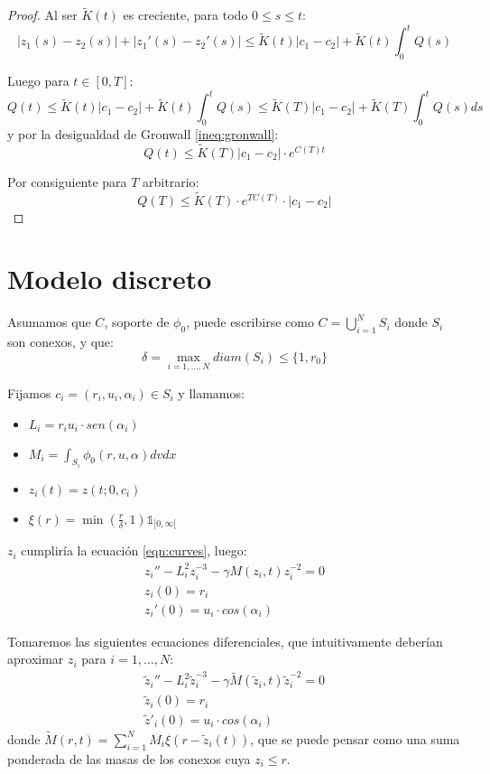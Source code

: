 \documentclass[a4paper,10pt]{scrartcl}
\theoremstyle{definition}
\numberwithin{equation}{section}
\begin{document}
\begin{proof}
 Al ser $\widetilde{K}(t)$ es creciente, para todo $0 \le s \le t$:
 \[
    |z_1(s) - z_2(s)| + |z_1'(s) - z_2'(s)|  \le \widetilde{K}(t)|c_1 - c_2| + \widetilde{K}(t) \int_0^t Q(s)
 \]

 Luego para $t\in [0,T]$:
 \[
  Q(t) \le \widetilde{K}(t)|c_1 - c_2| + \widetilde{K}(t) \int_0^t Q(s) \le \widetilde{K}(T)|c_1 - c_2| + \widetilde{K}(T) \int_0^t Q(s)ds
 \]
 y por la desigualdad de Gronwall \ref{ineq:gronwall}:
 \[
  Q(t) \le \widetilde{K}(T)|c_1 - c_2| \cdot e^{C(T)t}
 \]
 
 Por consiguiente para $T$ arbitrario:
 \[
  Q(T) \le \widetilde{K}(T)\cdot e^{TC(T)} \cdot |c_1 - c_2|
 \]
 
\end{proof}

\newpage
\section{Modelo discreto}
Asumamos que $C$, soporte de $\phi_0$, puede escribirse como $C= \bigcup_{i=1}^N S_i$ donde $S_i$ son conexos, y que:
\[
    \delta = \max_{i=1,\ldots, N} diam(S_i) \le \{1,r_0\}
\]

Fijamos $c_i = (r_i, u_i, \alpha_i) \in S_i$ y llamamos:
\begin{itemize}
\item $L_i = r_i u_i \cdot sen(\alpha_i)$
\item $M_i = \int_{S_i} \phi_0(r,u,\alpha) dv dx$
\item $z_i(t) = z(t;0,c_i)$
\item $\xi(r) = \min\left(\frac{r}{\delta},1\right) \mathds{1}_{]0,\infty[}$
\end{itemize}

$z_i$ cumpliría la ecuación \eqref{eqn:curves}, luego:
\begin{align*}
 z_i'' - L_i^2 z_i^{-3} - \gamma M(z_i, t) z_i^{-2} = 0\\
 z_i(0) = r_i\\
 z_i'(0) = u_i \cdot cos(\alpha_i)
\end{align*}

Tomaremos las siguientes ecuaciones diferenciales, que intuitivamente deberían aproximar $z_i$ para $i=1, \ldots, N$:
\begin{align}
 \label{eqn:approx-curves}
 \widetilde{z}_i'' - L_i^{2} \widetilde{z}_i^{-3} - \gamma \widetilde{M}(\widetilde{z}_i, t) \widetilde{z}_i^{-2} = 0 \nonumber\\
 \widetilde{z}_i(0) = r_i \nonumber\\
 \widetilde{z}'_i(0) = u_i \cdot cos(\alpha_i)
\end{align}
donde $\widetilde{M}(r,t) = \sum_{i=1}^N M_i \xi(r-\widetilde{z}_i(t))$, que se puede pensar como una suma ponderada de las masas de los conexos cuya $z_i \le r$.
\end{document}
